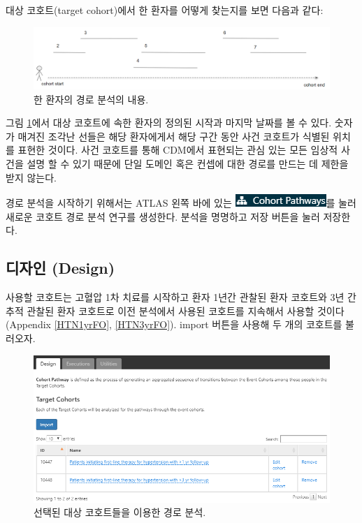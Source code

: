 \documentclass[11pt]{book}
\theoremstyle{definition}
\theoremstyle{definition}
\theoremstyle{definition}
\theoremstyle{remark}
\begin{document}
대상 코호트(target cohort)에서 한 환자를 어떻게 찾는지를 보면 다음과
같다:

\begin{figure}

{\centering \includegraphics[width=1\linewidth]{images/Characterization/pathwaysPersonEventView} 

}

\caption{한 환자의 경로 분석의 내용.}\label{fig:pathwaysPersonEventView}
\end{figure}

그림 \ref{fig:pathwaysPersonEventView}에서 대상 코호트에 속한 환자의
정의된 시작과 마지막 날짜를 볼 수 있다. 숫자가 매겨진 조각난 선들은 해당
환자에게서 해당 구간 동안 사건 코호트가 식별된 위치를 표현한 것이다.
사건 코호트를 통해 CDM에서 표현되는 관심 있는 모든 임상적 사건을 설명 할
수 있기 때문에 단일 도메인 혹은 컨셉에 대한 경로를 만드는 데 제한을 받지
않는다.

경로 분석을 시작하기 위해서는 ATLAS 왼쪽 바에 있는
\includegraphics{images/Characterization/atlasPathwaysMenuItem.png}를
눌러 새로운 코호트 경로 분석 연구를 생성한다. 분석을 명명하고 저장
버튼을 눌러 저장한다.

\subsection{디자인 (Design)}\label{-design-1}

사용할 코호트는 고혈압 1차 치료를 시작하고 환자 1년간 관찰된 환자
코호트와 3년 간 추적 관찰된 환자 코호트로 이전 분석에서 사용된 코호트를
지속해서 사용할 것이다 (Appendix \ref{HTN1yrFO}, \ref{HTN3yrFO}). import
버튼을 사용해 두 개의 코호트를 불러오자.

\begin{figure}

{\centering \includegraphics[width=1\linewidth]{images/Characterization/atlasPathwaysTargetCohorts} 

}

\caption{선택된 대상 코호트들을 이용한 경로 분석.}\label{fig:atlasPathwaysTargetCohorts}
\end{figure}
\end{document}
